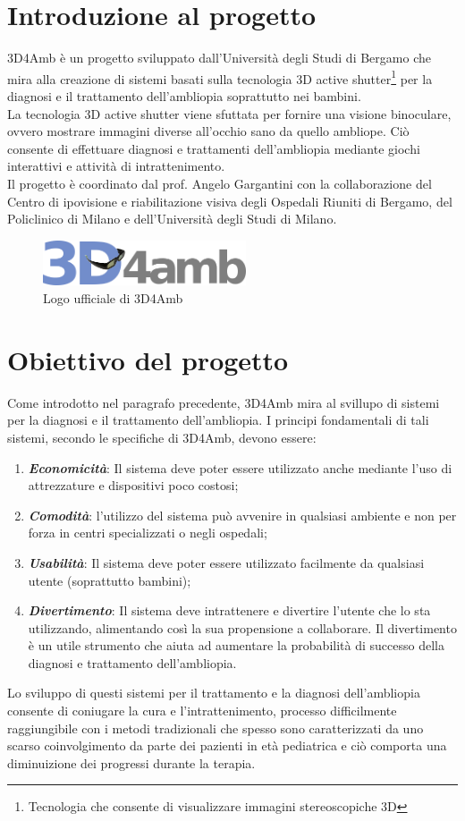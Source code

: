 \documentclass[12pt,a4paper,openright,twoside]{book}
\begin{document}
    \section{Introduzione al progetto}
    3D4Amb è un progetto sviluppato dall'Università degli Studi di Bergamo che mira alla creazione di sistemi basati sulla tecnologia 3D active shutter\footnote{Tecnologia che consente di visualizzare immagini stereoscopiche 3D} per la diagnosi e il trattamento dell'ambliopia soprattutto nei bambini.\\
    La tecnologia 3D active shutter viene sfuttata per fornire una visione binoculare, ovvero mostrare immagini diverse all'occhio sano da quello ambliope. Ciò consente di effettuare diagnosi e trattamenti dell'ambliopia mediante giochi interattivi e attività di intrattenimento.\\
    Il progetto è coordinato dal prof. Angelo Gargantini con la collaborazione del Centro di ipovisione e riabilitazione visiva degli Ospedali Riuniti di Bergamo, del Policlinico di Milano e dell'Università degli Studi di Milano.
    \begin{figure}[h]
    	\centering   	
    	\includegraphics[width=60mm]{logo3d4amb.png}
    	\caption{Logo ufficiale di 3D4Amb}
    	\label{fig:3d4amb}
    \end{figure}
    \section{Obiettivo del progetto}
    Come introdotto nel paragrafo precedente, 3D4Amb mira al svillupo di sistemi per la diagnosi e il trattamento dell'ambliopia. I principi fondamentali di tali sistemi, secondo le specifiche di 3D4Amb, devono essere:
    \begin{enumerate}
    	\item \textbf{\textit{Economicità}}: Il sistema deve poter essere utilizzato anche mediante l'uso di attrezzature e dispositivi poco costosi;
    	\item \textbf{\textit{Comodità}}: l'utilizzo del sistema può avvenire in qualsiasi ambiente e non per forza in centri specializzati o negli ospedali;
    	\item \textbf{\textit{Usabilità}}: Il sistema deve poter essere utilizzato facilmente da qualsiasi utente (soprattutto bambini);
    	\item \textbf{\textit{Divertimento}}: Il sistema deve intrattenere e divertire l'utente che lo sta utilizzando, alimentando così la sua propensione a collaborare. Il divertimento è un utile strumento che aiuta ad aumentare la probabilità di successo della diagnosi e trattamento dell'ambliopia. 
    \end{enumerate}
	Lo sviluppo di questi sistemi per il trattamento e la diagnosi dell'ambliopia consente di coniugare la cura e l'intrattenimento, processo difficilmente raggiungibile con i metodi tradizionali che spesso sono caratterizzati da uno scarso coinvolgimento da parte dei pazienti in età pediatrica e ciò comporta una diminuizione dei progressi durante la terapia.	
\end{document}
